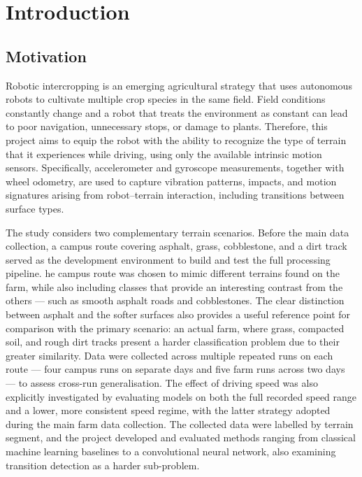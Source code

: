 \chapter{Introduction}
\label{ch:introduction}

\section{Motivation}

Robotic intercropping is an emerging agricultural strategy that uses autonomous robots to cultivate multiple crop species in the same field. Field conditions constantly change and a robot that treats the environment as constant can lead to poor navigation, unnecessary stops, or damage to plants. \cite{RoboticIntercroppingProject2026} Therefore, this project aims to equip the robot with the ability to recognize the type of terrain that it experiences while driving, using only the available intrinsic motion sensors. Specifically, accelerometer and gyroscope measurements, together with wheel odometry, are used to capture vibration patterns, impacts, and motion signatures arising from robot–terrain interaction, including transitions between surface types.

The study considers two complementary terrain scenarios. Before the main data collection, a campus route covering asphalt, grass, cobblestone, and a dirt track served as the development environment to build and test the full processing pipeline. he campus route was chosen to mimic different terrains found on the farm, while also including classes that provide an interesting contrast from the others — such as smooth asphalt roads and cobblestones. The clear distinction between asphalt and the softer surfaces also provides a useful reference point for comparison with the primary scenario: an actual farm, where grass, compacted soil, and rough dirt tracks present a harder classification problem due to their greater similarity. Data were collected across multiple repeated runs on each route — four campus runs on separate days and five farm runs across two days — to assess cross-run generalisation. The effect of driving speed was also explicitly investigated by evaluating models on both the full recorded speed range and a lower, more consistent speed regime, with the latter strategy adopted during the main farm data collection. The collected data were labelled by terrain segment, and the project developed and evaluated methods ranging from classical machine learning baselines to a convolutional neural network, also examining transition detection as a harder sub-problem.

